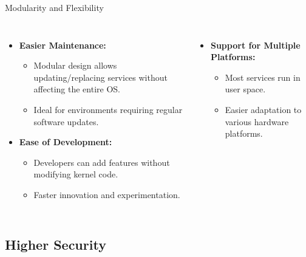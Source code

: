 \documentclass[aspectratio=169, table]{beamer}
\begin{document}
\begin{frame}{Modularity and Flexibility}
\begin{columns}
\begin{itemize}
	\item \textbf{Easier Maintenance:}
	\begin{itemize}
		\item Modular design allows updating/replacing services without affecting the entire OS.
		\item Ideal for environments requiring regular software updates.
	\end{itemize}
	
	\item \textbf{Ease of Development:}
	\begin{itemize}
		\item Developers can add features without modifying kernel code.
		\item Faster innovation and experimentation.
	\end{itemize}
\end{itemize}
\begin{itemize}
	\item \textbf{Support for Multiple Platforms:}
	\begin{itemize}
		\item Most services run in user space.
		\item Easier adaptation to various hardware platforms.
	\end{itemize}
\end{itemize}
\end{columns}
\end{frame}

\subsection{Higher Security}
\end{document}
